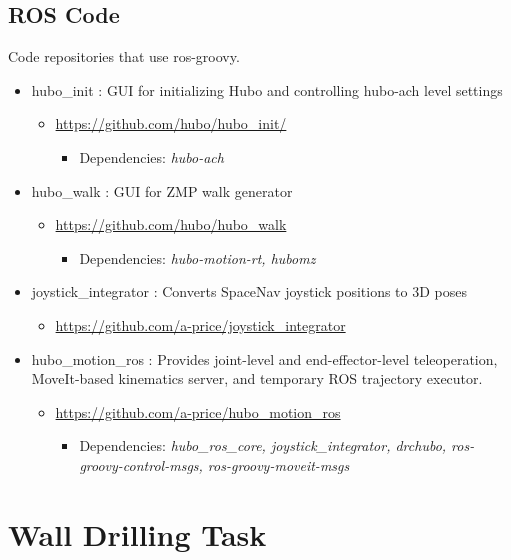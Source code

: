 \documentclass[letterpaper, 10 pt]{report}
\begin{document}
\subsection{ROS Code}
Code repositories that use ros-groovy.
\begin{itemize}
\item hubo\_init : GUI for initializing Hubo and controlling hubo-ach level settings
  \begin{itemize}
	\item \url{https://github.com/hubo/hubo\_init/}
	  \begin{itemize}
	    \item Dependencies: \textit{hubo-ach}
	  \end{itemize}
  \end{itemize}
\item hubo\_walk : GUI for ZMP walk generator
  \begin{itemize}
	\item \url{https://github.com/hubo/hubo\_walk}
	  \begin{itemize}
	    \item Dependencies: \textit{hubo-motion-rt, hubomz}
	  \end{itemize}
  \end{itemize}
\item joystick\_integrator : Converts SpaceNav joystick positions to 3D poses
  \begin{itemize}
    \item \url{https://github.com/a-price/joystick\_integrator}
  \end{itemize}
\item hubo\_motion\_ros : Provides joint-level and end-effector-level teleoperation, MoveIt-based kinematics server, and temporary ROS trajectory executor.
  \begin{itemize}
	\item \url{https://github.com/a-price/hubo\_motion\_ros}
	  \begin{itemize}
	    \item Dependencies: \textit{hubo\_ros\_core, joystick\_integrator, drchubo, ros-groovy-control-msgs, ros-groovy-moveit-msgs}
	  \end{itemize}
  \end{itemize}
\end{itemize}
\newpage

%
\section{Wall Drilling Task}\label{wall-drilling-task}
\end{document}
